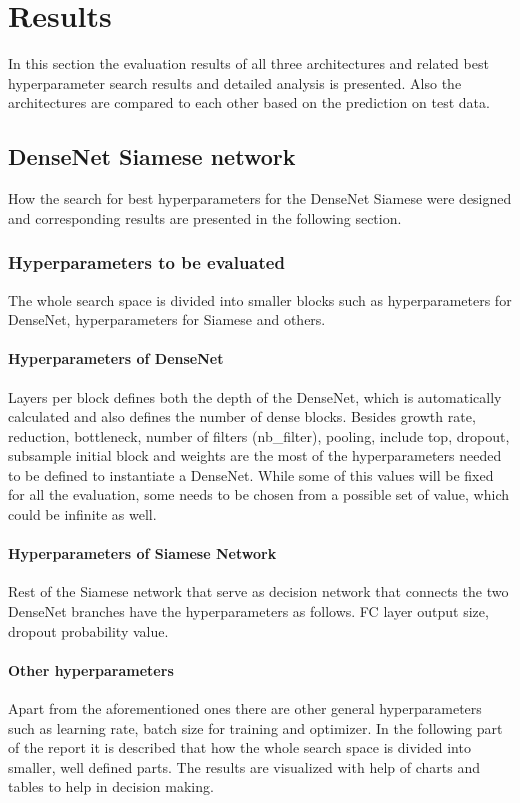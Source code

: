 
\chapter{Results}
In this section the evaluation results of all three architectures and related best hyperparameter search results and detailed analysis is presented. Also the architectures are compared to each other based on the prediction on test data.

\section{DenseNet Siamese network}
How the search for best hyperparameters for the DenseNet Siamese were designed and corresponding results are presented in the following section. 

\subsection{Hyperparameters to be evaluated}
The whole search space is divided into smaller blocks such as hyperparameters for DenseNet, hyperparameters for Siamese and others.
\subsubsection{Hyperparameters of DenseNet}
\label{hyperDenseNet}
Layers per block defines both the depth of the DenseNet, which is automatically calculated and also defines the number of dense blocks. Besides growth rate, reduction, bottleneck, number of filters (nb\_filter), pooling,
include top, dropout, subsample initial block and weights are the most of the hyperparameters needed to be defined to instantiate a DenseNet. While some of this values will be fixed for all the evaluation, some needs to be 
chosen from a possible set of value, which could be infinite as well. 

\subsubsection{Hyperparameters of Siamese Network}
Rest of the Siamese network that serve as decision network that connects the two DenseNet branches have the hyperparameters as follows. FC layer output size, dropout probability value.


\subsubsection{Other hyperparameters}
Apart from the aforementioned ones there are other general hyperparameters such as learning rate, batch size for training and optimizer. 
In the following part of the report it is described that how the whole search space is divided into smaller, well defined parts. The results are visualized with help of charts and tables to help in decision making.

